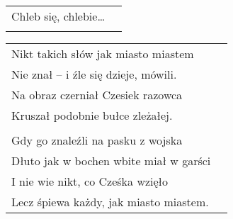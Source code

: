 \documentclass[a5paper]{article}
\begin{document}
\noindent
\begin{tabular}{@{}p{8.5cm}p{3cm}@{}} 
Chleb się, chlebie… \\ \\
\end{tabular}

\noindent
\begin{tabular}{@{}p{8.5cm}p{3cm}@{}}
Nikt takich słów jak miasto miastem \\
Nie znał – i źle się dzieje, mówili. \\
Na obraz czerniał Czesiek razowca \\
Kruszał podobnie bułce zleżałej. \\ \\
 
Gdy go znaleźli na pasku z wojska \\
Dłuto jak w bochen wbite miał w garści \\
I nie wie nikt, co Cześka wzięło \\
Lecz śpiewa każdy, jak miasto miastem.
\end{tabular}
\end{document}

